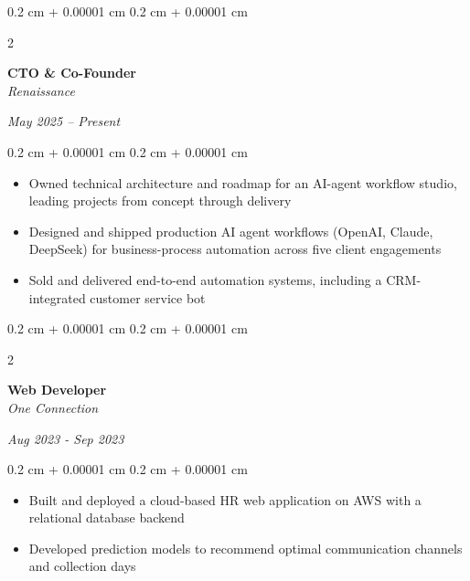 \documentclass[10pt, letterpaper]{article}
\newenvironment{onecolentry}{
    \begin{adjustwidth}{
        0.2 cm + 0.00001 cm
    }{
        0.2 cm + 0.00001 cm
    }
}{
    \end{adjustwidth}
} %
\newenvironment{twocolentry}[2][]{
    \onecolentry
    \def\secondColumn{#2}
    \setcolumnwidth{\fill, 4.5 cm}
    \begin{paracol}{2}
}{
    \switchcolumn \raggedleft \secondColumn
    \end{paracol}
    \endonecolentry
} %
\begin{document}
    \vspace{0.12 cm}
    \begin{twocolentry}{
    \textit{May 2025 – Present}}
        \textbf{CTO \& Co-Founder} \\
        \textit{Renaissance}
    \end{twocolentry}
    \begin{onecolentry}
        \begin{itemize}
            \item Owned technical architecture and roadmap for an AI-agent workflow studio, leading projects from concept through delivery
            \item Designed and shipped production AI agent workflows (OpenAI, Claude, DeepSeek) for business-process automation across five client engagements
            \item Sold and delivered end-to-end automation systems, including a CRM-integrated customer service bot
        \end{itemize}
    \end{onecolentry}

    \vspace{0.12 cm}
    \begin{twocolentry}{
    \textit{Aug 2023 - Sep 2023}}
        \textbf{Web Developer} \\
        \textit{One Connection}
    \end{twocolentry}
    \begin{onecolentry}
        \begin{itemize}
            \item Built and deployed a cloud-based HR web application on AWS with a relational database backend
            \item Developed prediction models to recommend optimal communication channels and collection days
        \end{itemize}
    \end{onecolentry}
\end{document}
